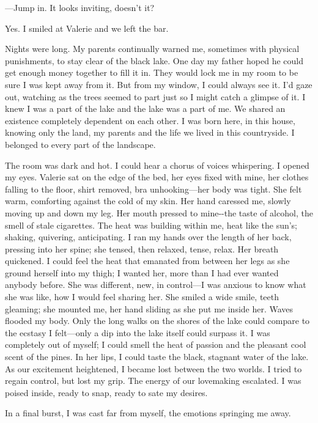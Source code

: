 ---Jump in. It looks inviting, doesn't it?

Yes. I smiled at Valerie and we left the bar.

Nights were long. My parents continually warned me, sometimes with
physical punishments, to stay clear of the black lake. One day my father
hoped he could get enough money together to fill it in. They would lock
me in my room to be sure I was kept away from it. But from my window, I
could always see it. I'd gaze out, watching as the trees seemed to part
just so I might catch a glimpse of it. I knew I was a part of the lake
and the lake was a part of me. We shared an existence completely
dependent on each other. I was born here, in this house, knowing only
the land, my parents and the life we lived in this countryside. I
belonged to every part of the landscape.

The room was dark and hot. I could hear a chorus of voices whispering. I
opened my eyes. Valerie sat on the edge of the bed, her eyes fixed with
mine, her clothes falling to the floor, shirt removed, bra
unhooking---her body was tight. She felt warm, comforting against the
cold of my skin. Her hand caressed me, slowly moving up and down my leg.
Her mouth pressed to mine-\/-the taste of alcohol, the smell of stale
cigarettes. The heat was building within me, heat like the sun's;
shaking, quivering, anticipating. I ran my hands over the length of her
back, pressing into her spine; she tensed, then relaxed, tense, relax.
Her breath quickened. I could feel the heat that emanated from between
her legs as she ground herself into my thigh; I wanted her, more than I
had ever wanted anybody before. She was different, new, in control---I
was anxious to know what she was like, how I would feel sharing her. She
smiled a wide smile, teeth gleaming; she mounted me, her hand sliding as
she put me inside her. Waves flooded my body. Only the long walks on the
shores of the lake could compare to the ecstasy I felt---only a dip into
the lake itself could surpass it. I was completely out of myself; I
could smell the heat of passion and the pleasant cool scent of the
pines. In her lips, I could taste the black, stagnant water of the lake.
As our excitement heightened, I became lost between the two worlds. I
tried to regain control, but lost my grip. The energy of our lovemaking
escalated. I was poised inside, ready to snap, ready to sate my desires.

In a final burst, I was cast far from myself, the emotions springing me
away.


